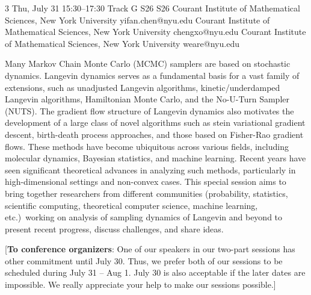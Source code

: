 \begin{talk}
  {3}%
  {}%
  {}%
  {}%
  {}%
  {}%
  {Thu, July 31 15:30–17:30 Track G}%
  {S26}%
  {S26}%
  {%
    {Courant Institute of Mathematical Sciences, New York University}%
    {yifan.chen@nyu.edu}}%
  {%
	{Courant Institute of Mathematical Sciences, New York University}%
	{chengxo@nyu.edu}}%
    {
    {Courant Institute of Mathematical Sciences, New York University}
    {weare@nyu.edu}}
 



Many Markov Chain Monte Carlo (MCMC) samplers are based on stochastic dynamics. Langevin dynamics serves as a fundamental basis for a vast family of extensions, such as unadjusted Langevin algorithms, kinetic/underdamped Langevin algorithms, Hamiltonian Monte Carlo, and the No-U-Turn Sampler (NUTS). The gradient flow structure of Langevin dynamics also motivates the development of a large class of novel algorithms such as stein variational gradient descent, birth-death process approaches, and those based on Fisher-Rao gradient flows. These methods have become ubiquitous across various fields, including molecular dynamics, Bayesian statistics, and machine learning. Recent years have seen significant theoretical advances in analyzing such methods, particularly in high-dimensional settings and non-convex cases. This special session aims to bring together researchers from different communities (probability, statistics, scientific computing, theoretical computer science, machine learning, etc.)\ working on analysis of sampling dynamics of Langevin and beyond to present recent progress, discuss challenges, and share ideas.

[\textbf{To conference organizers}: One of our speakers in our two-part sessions has other commitment until July 30. Thus, we prefer both of our sessions to be scheduled during July 31 -- Aug 1. July 30 is also acceptable if the later dates are impossible. We really appreciate your help to make our sessions possible.]


\end{talk}
